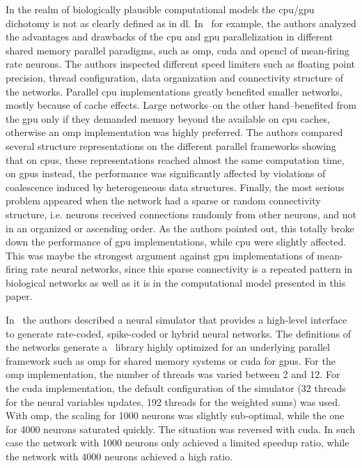{In the realm of biologically plausible computational models the \gls{cpu}/\gls{gpu} dichotomy is not as clearly defined as in \gls{dl}. In~\cite{doi:10.3109/0954898X.2012.739292} for example, the authors analyzed the advantages and drawbacks of the \gls{cpu} and \gls{gpu} parallelization in different shared memory parallel paradigms, such as \gls{omp}, \gls{cuda} and \gls{opencl} of mean-firing rate neurons. The authors inspected different speed limiters such as floating point precision, thread configuration, data organization and connectivity structure of the networks. Parallel \gls{cpu} implementations greatly benefited smaller networks, mostly because of cache effects. Large networks--on the other hand--benefited from the \gls{gpu} only if they demanded memory beyond the available on \gls{cpu} caches, otherwise an \gls{omp} implementation was highly preferred. The authors compared several structure representations on the different parallel frameworks showing that on \glspl{cpu}, these representations reached almost the same computation time, on \glspl{gpu} instead, the performance was significantly affected by violations of coalescence induced by heterogeneous data structures. Finally, the most serious problem appeared when the network had a sparse or random connectivity structure, i.e. neurons received connections randomly from other neurons, and not in an organized or ascending order. As the authors pointed out, this totally broke down the performance of \gls{gpu} implementations, while \gls{cpu} were slightly affected. This was maybe the strongest argument against \gls{gpu} implementations of mean-firing rate neural networks, since this sparse connectivity is a repeated pattern in biological networks as well as it is in the computational model presented in this paper.

In~\cite{10.3389/fninf.2015.00019} the authors described a neural simulator that provides a high-level interface to generate rate-coded, spike-coded or hybrid neural networks. The definitions of the networks generate a \CC~library highly optimized for an underlying parallel framework such as \gls{omp} for shared memory systems or \gls{cuda} for \glspl{gpu}. For the \gls{omp} implementation, the number of threads was varied between 2 and 12. For the \gls{cuda} implementation, the default configuration of the simulator (32 threads for the neural variables updates, 192 threads for the weighted sums) was used. With \gls{omp}, the scaling for 1000 neurons was slightly sub-optimal, while the one for 4000 neurons saturated quickly. The situation was reversed with \gls{cuda}. In such case the network with 1000 neurons only achieved a limited speedup ratio, while the network with 4000 neurons achieved a high ratio.

}
